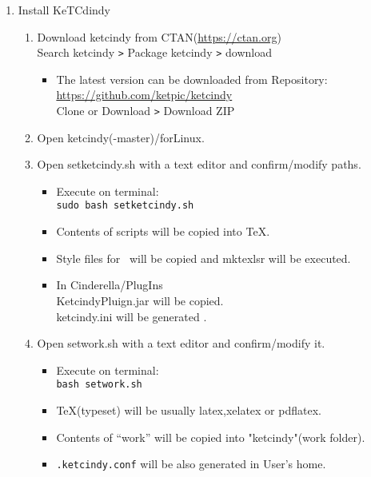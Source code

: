 \documentclass{article}
\begin{document}
\begin{enumerate}[\bf\large 1.]
\item Install KeTCdindy
  \begin{enumerate}[(1)]
  \item Download ketcindy from CTAN(\url{https://ctan.org})\\
  \hspace*{10mm}Search ketcindy \verb|>| Pack­age ketcindy \verb|>| download
    \begin{itemize}
    \item The latest version can be downloaded from Repository:\\
        \hspace*{5mm}\url{https://github.com/ket­pic/ketcindy}\\
        \hspace*{10mm}Clone or Download \verb|>| Download ZIP
    \end{itemize}
  \item Open ketcindy(-master)/forLinux.
  \item Open setketcindy.sh with a text editor and confirm/modify paths.
    \begin{itemize}
    \item Execute on terminal:\\
    \hspace*{10mm}\verb|sudo bash setketcindy.sh|
    \item Contents of scripts will be copied into TeX.
    \item Style files for \ketcindy\ will be copied and mktexlsr will be executed.
    \item In Cinderella/PlugIns\\
    \hspace*{5mm}KetcindyPluign.jar will be copied.\\
    \hspace*{5mm}ketcindy.ini will be generated .
    \end{itemize}
  \item Open setwork.sh with a text editor and confirm/modify it.
    \begin{itemize}
    \item Execute on terminal:\\
    \hspace*{10mm}\verb|bash setwork.sh|
    \item TeX(typeset) will be usually latex,xelatex or pdflatex.
    \item Contents of “work” will be copied into "ketcindy"(work folder).
    \item \verb|.ketcindy.conf| will be also generated in User's home.\\

\end{itemize}
\end{enumerate}
\end{enumerate}
\end{document}
